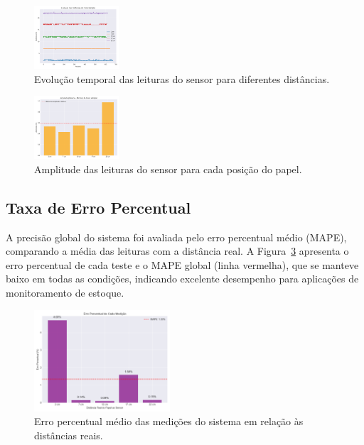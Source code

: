 \documentclass[english,hidelinks]{sbrt}
\begin{document}
\begin{figure}[H]
    \centering
    \includegraphics[width=0.28\textwidth]{graficos/series_temporais.png}
    \caption{Evolução temporal das leituras do sensor para diferentes distâncias.}
    \label{fig:series_temporais}
\end{figure}

\begin{figure}[H]
    \centering
    \includegraphics[width=0.28\textwidth]{graficos/amplitudes.png}
    \caption{Amplitude das leituras do sensor para cada posição do papel.}
    \label{fig:amplitudes}
\end{figure}

\subsection{Taxa de Erro Percentual}
A precisão global do sistema foi avaliada pelo erro percentual médio (MAPE), comparando a média das leituras com a distância real. A Figura~\ref{fig:erro_percentual} apresenta o erro percentual de cada teste e o MAPE global (linha vermelha), que se manteve baixo em todas as condições, indicando excelente desempenho para aplicações de monitoramento de estoque.

\begin{figure}[H]
    \centering
    \includegraphics[width=0.45\textwidth]{graficos/erro_percentual.png}
    \caption{Erro percentual médio das medições do sistema em relação às distâncias reais.}
    \label{fig:erro_percentual}
\end{figure}
\end{document}
